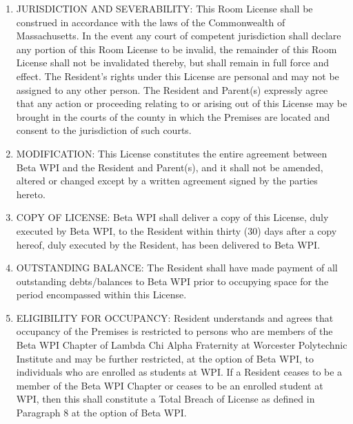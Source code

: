 \documentclass[legalpaper, 12pt]{article} \usepackage{lease}
\begin{document}
\begin{enumerate}
        \item JURISDICTION AND SEVERABILITY: This Room License shall be
                construed in accordance with the laws of the Commonwealth of
                Massachusetts.  In the event any court of competent jurisdiction
                shall declare any portion of this Room License to be invalid,
                the remainder of this Room License shall not be invalidated
                thereby, but shall remain in full force and effect.  The
                Resident’s rights under this License are personal and may not be
                assigned to any other person.  The Resident and Parent(s)
                expressly agree that any action or proceeding relating to or
                arising out of this License may be brought in the courts of the
                county in which the Premises are located and consent to the
                jurisdiction of such courts.

        \item MODIFICATION: This License constitutes the entire agreement
                between Beta WPI and the Resident and Parent(s), and it shall
                not be amended, altered or changed except by a written agreement
                signed by the parties hereto.
        
        \item COPY OF LICENSE: Beta WPI shall deliver a copy of this License,
                duly executed by Beta WPI, to the Resident within thirty (30)
                days after a copy hereof, duly executed by the Resident, has
                been delivered to Beta WPI.

        \item OUTSTANDING BALANCE: The Resident shall have made payment of all
                outstanding debts/balances to Beta WPI prior to occupying space
                for the period encompassed within this License.

        \item ELIGIBILITY FOR OCCUPANCY: Resident understands and agrees that
                occupancy of the Premises is restricted to persons who are
                members of the Beta WPI Chapter of Lambda Chi Alpha Fraternity
                at Worcester Polytechnic Institute and may be further
                restricted, at the option of Beta WPI, to individuals who are
                enrolled as students at WPI\@. If a Resident ceases to be a
                member of the Beta WPI Chapter or ceases to be an enrolled
                student at WPI, then this shall constitute a Total Breach of
                License as defined in Paragraph 8 at the option of Beta WPI\@.


\end{enumerate}
\end{document}

